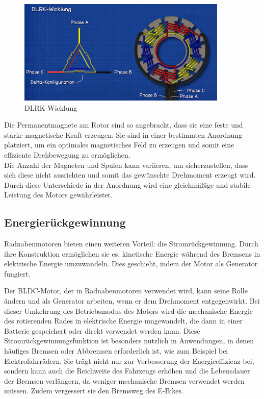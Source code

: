 \begin{figure}[h]
    \centering
    \includegraphics[width=10cm]{images/DLRK-Wicklung.png}
    \caption{DLRK-Wicklung\cite{ingenieursmentalitat_burstenloser_2022}}%
    \label{fig:12}
\end{figure}

Die Permanentmagnete am Rotor sind so angebracht, dass sie eine feste und starke magnetische Kraft erzeugen.
Sie sind in einer bestimmten Anordnung platziert, um ein optimales magnetisches Feld zu erzeugen und somit eine effiziente Drehbewegung zu ermöglichen.\\
Die Anzahl der Magneten und Spulen kann variieren, um sicherzustellen, dass sich diese nicht ausrichten und somit das gewünschte Drehmoment erzeugt wird.
Durch diese Unterschiede in der Anordnung wird eine gleichmäßige und stabile Leistung des Motors gewährleistet.\\







\subsection{Energierückgewinnung}

Radnabenmotoren bieten einen weiteren Vorteil: die Stromrückgewinnung.
Durch ihre Konstruktion ermöglichen sie es, kinetische Energie während des Bremsens in elektrische Energie umzuwandeln.
Dies geschieht, indem der Motor als Generator fungiert.

Der BLDC-Motor, der in Radnabenmotoren verwendet wird, kann seine Rolle ändern und als Generator arbeiten, wenn er dem Drehmoment entgegenwirkt.
Bei dieser Umkehrung des Betriebsmodus des Motors wird die mechanische Energie des rotierenden Rades in elektrische Energie umgewandelt, die dann in einer Batterie gespeichert oder direkt verwendet werden kann.
Diese Stromrückgewinnungsfunktion ist besonders nützlich in Anwendungen, in denen häufiges Bremsen oder Abbremsen erforderlich ist, wie zum Beispiel bei Elektrofahrrädern.
Sie trägt nicht nur zur Verbesserung der Energieeffizienz bei, sondern kann auch die Reichweite des Fahrzeugs erhöhen und die Lebensdauer der Bremsen verlängern, da weniger mechanische Bremsen verwendet werden müssen.
Zudem vergessert sie den Bremsweg des E-Bikes.

